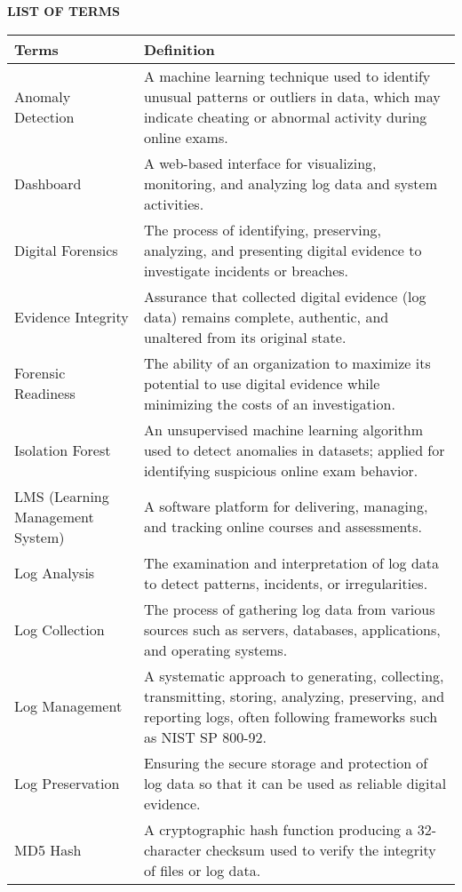 \begin{center}  
\normalfont\LARGE\textbf{LIST OF TERMS}
\end{center}
\begin{longtable}{p{2.5cm} p{11.5cm}}
	\textbf{Terms} & \textbf{Definition}\\
	\hline \endhead
	Anomaly Detection & A machine learning technique used to identify unusual patterns or outliers in data, which may indicate cheating or abnormal activity during online exams.\\
	Dashboard & A web-based interface for visualizing, monitoring, and analyzing log data and system activities.\\
	Digital Forensics & The process of identifying, preserving, analyzing, and presenting digital evidence to investigate incidents or breaches.\\
	Evidence Integrity & Assurance that collected digital evidence (log data) remains complete, authentic, and unaltered from its original state.\\
	Forensic Readiness & The ability of an organization to maximize its potential to use digital evidence while minimizing the costs of an investigation.\\
	Isolation Forest & An unsupervised machine learning algorithm used to detect anomalies in datasets; applied for identifying suspicious online exam behavior.\\
	LMS (Learning Management System) & A software platform for delivering, managing, and tracking online courses and assessments.\\
	Log Analysis & The examination and interpretation of log data to detect patterns, incidents, or irregularities.\\
	Log Collection & The process of gathering log data from various sources such as servers, databases, applications, and operating systems.\\
	Log Management & A systematic approach to generating, collecting, transmitting, storing, analyzing, preserving, and reporting logs, often following frameworks such as NIST SP 800-92.\\
	Log Preservation & Ensuring the secure storage and protection of log data so that it can be used as reliable digital evidence.\\
	MD5 Hash & A cryptographic hash function producing a 32-character checksum used to verify the integrity of files or log data.\\

\end{longtable}
